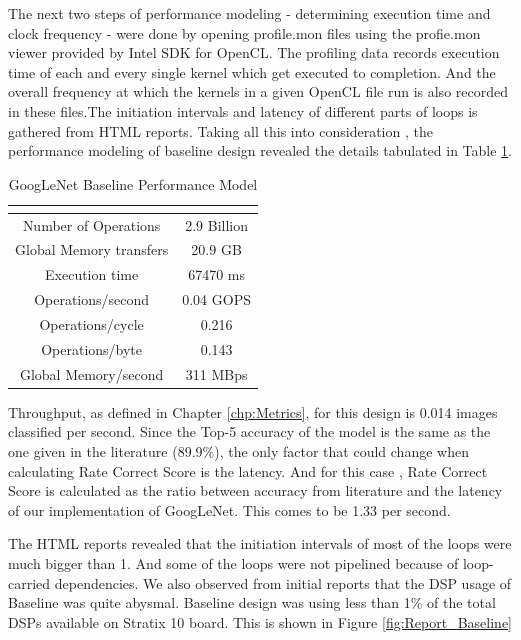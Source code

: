 The next two steps of performance modeling - determining execution time and clock frequency - were done by opening profile.mon files using the profie.mon viewer provided by Intel SDK for OpenCL. The profiling data records execution time of each and every single kernel which get executed to completion. And the overall frequency at which the kernels in a given OpenCL file run is also recorded in these files.The initiation intervals and latency of different parts of loops is gathered from HTML reports. Taking all this into consideration , the performance modeling of baseline design revealed the details tabulated in Table \ref{tab:GoogLeNetBaselinePerfModel}.
\begin{table}[!htb]  
 \centering
 \captionsetup{
 justification = centering
}
\caption{GoogLeNet Baseline Performance Model}

    \begin{tabular}{|c|c|}
    \multicolumn{2}{c}{\textbf{}} \\ \hline

     Number of Operations    &   2.9 Billion \\ \hline
      Global Memory transfers &   20.9 GB            \\ \hline          
      Execution time    &  67470 ms    \\ \hline
      Operations/second   &   0.04 GOPS \\ \hline
      Operations/cycle &   0.216             \\ \hline
      Operations/byte       &   0.143     \\ \hline
      Global Memory/second & 311 MBps  \\ \hline

    \end{tabular}
    
    \label{tab:GoogLeNetBaselinePerfModel}                            

\end{table}  

Throughput, as defined in Chapter \ref{chp:Metrics}, for this design is 0.014 images classified per second. Since  the Top-5 accuracy of the model is the same as the one given in the literature (89.9\%), the only factor that could change when calculating Rate Correct Score is the latency. And for this case , Rate Correct Score is calculated as the ratio between accuracy from literature and the latency of our implementation of GoogLeNet. This comes to be  1.33 per second.

The HTML reports revealed that the initiation intervals of most of the loops were much bigger than 1. And some of the loops were not pipelined because of loop-carried dependencies. We also observed from initial reports that the DSP usage of Baseline was quite abysmal. Baseline design was using less than 1\% of the total DSPs available on Stratix 10 board. This is shown in Figure \ref{fig:Report_Baseline}   


